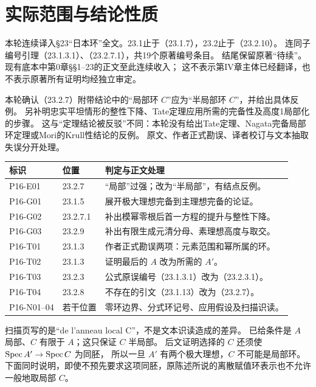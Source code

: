 
\section*{实际范围与结论性质}
本轮连续译入\S23“日本环”全文。23.1止于（23.1.7），23.2止于（23.2.10）。
连同子编号引理（23.1.3.1）、（23.2.7.1），共19个原著编号条目。
结尾保留原著“待续”。现有底本中第0章\S\S1--23的正文至此连续收入；
这不表示第IV章主体已经翻译，也不表示原著所有证明均经独立审定。

本轮确认（23.2.7）附带结论中的“局部环 $C$”应为“半局部环 $C$”，并给出具体反例。
另补明忠实平坦情形的整性下降、Tate定理应用所需的完备性及高度1局部化的步骤。
这与“定理结论被反驳”不同：本轮没有给出Tate定理、Nagata完备局部环定理或Mori的Krull性结论的反例。
原文、作者正式勘误、译者校订与文本抽取失误分开处理。

\begin{longtable}{@{}p{.18\linewidth}p{.20\linewidth}p{.52\linewidth}@{}}
\toprule 标识&位置&判定与正文处理\\\midrule\endhead
P16-E01&23.2.7&“局部”过强；改为“半局部”，有结点反例。\\
P16-G01&23.1.5&展开极大理想完备到主理想完备的论证。\\
P16-G02&23.2.7.1&补出模幂零根后首一方程的提升与整性下降。\\
P16-G03&23.2.9&补出有限生成元清分母、素理想高度与取交。\\
P16-T01&23.1.3&作者正式勘误两项：元素范围和幂所属的环。\\
P16-T02&23.1.3&证明最后的 $A$ 改为所需的 $A'$。\\
P16-T03&23.2.3&公式原误编号（23.1.3.1）改为（23.2.3.1）。\\
P16-T04&23.2.8&不存在的引文（23.1.13）改为（23.2.7）。\\
P16-N01--04&若干位置&零环边界、分式环记号、应用假设及扫描识读。\\
\bottomrule
\end{longtable}

扫描页写的是“de l'anneau local C”，不是文本识读造成的差异。
已给条件是 $A$ 局部、$C$ 有限于 $A$；这只保证 $C$ 半局部。
后文证明选择的 $C$ 还须使 $\operatorname{Spec} A'\to\operatorname{Spec} C$ 为同胚，
所以一旦 $A'$ 有两个极大理想，$C$ 不可能是局部环。
下面同时说明，即使不预先要求这项同胚，原陈述所说的离散赋值环表示也不允许一般地取局部 $C$。

